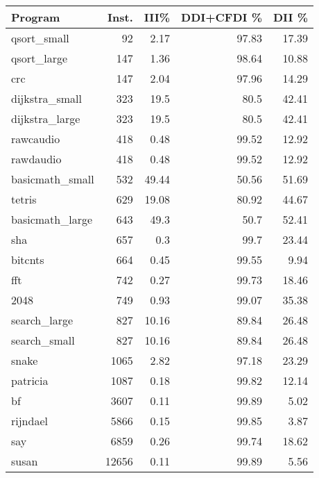 \begin{tabular}{l|r|r|r|r}
\hline
 Program         &   Inst. &   III\% &   DDI+CFDI \% &   DII \% \\
\hline
 qsort\_small     &      92 &   2.17 &        97.83 &   17.39 \\
\hline
 qsort\_large     &     147 &   1.36 &        98.64 &   10.88 \\
\hline
 crc             &     147 &   2.04 &        97.96 &   14.29 \\
\hline
 dijkstra\_small  &     323 &  19.5  &        80.5  &   42.41 \\
\hline
 dijkstra\_large  &     323 &  19.5  &        80.5  &   42.41 \\
\hline
 rawcaudio       &     418 &   0.48 &        99.52 &   12.92 \\
\hline
 rawdaudio       &     418 &   0.48 &        99.52 &   12.92 \\
\hline
 basicmath\_small &     532 &  49.44 &        50.56 &   51.69 \\
\hline
 tetris          &     629 &  19.08 &        80.92 &   44.67 \\
\hline
 basicmath\_large &     643 &  49.3  &        50.7  &   52.41 \\
\hline
 sha             &     657 &   0.3  &        99.7  &   23.44 \\
\hline
 bitcnts         &     664 &   0.45 &        99.55 &    9.94 \\
\hline
 fft             &     742 &   0.27 &        99.73 &   18.46 \\
\hline
 2048            &     749 &   0.93 &        99.07 &   35.38 \\
\hline
 search\_large    &     827 &  10.16 &        89.84 &   26.48 \\
\hline
 search\_small    &     827 &  10.16 &        89.84 &   26.48 \\
\hline
 snake           &    1065 &   2.82 &        97.18 &   23.29 \\
\hline
 patricia        &    1087 &   0.18 &        99.82 &   12.14 \\
\hline
 bf              &    3607 &   0.11 &        99.89 &    5.02 \\
\hline
 rijndael        &    5866 &   0.15 &        99.85 &    3.87 \\
\hline
 say             &    6859 &   0.26 &        99.74 &   18.62 \\
\hline
 susan           &   12656 &   0.11 &        99.89 &    5.56 \\

\end{tabular}
